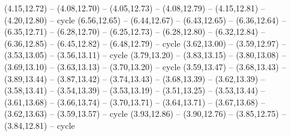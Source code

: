 {  (4.15,12.72) -- (4.08,12.70) -- (4.05,12.73) -- (4.08,12.79) -- (4.15,12.81) -- (4.20,12.80) -- cycle
  (6.56,12.65) -- (6.44,12.67) -- (6.43,12.65) -- (6.36,12.64) -- (6.35,12.71) -- (6.28,12.70) -- (6.25,12.73) -- (6.28,12.80) -- (6.32,12.84) -- (6.36,12.85) -- (6.45,12.82) -- (6.48,12.79) -- cycle
  (3.62,13.00) -- (3.59,12.97) -- (3.53,13.05) -- (3.56,13.11) -- cycle
  (3.79,13.20) -- (3.83,13.15) -- (3.80,13.08) -- (3.69,13.10) -- (3.63,13.13) -- (3.70,13.20) -- cycle
  (3.59,13.47) -- (3.68,13.43) -- (3.89,13.44) -- (3.87,13.42) -- (3.74,13.43) -- (3.68,13.39) -- (3.62,13.39) -- (3.58,13.41) -- (3.54,13.39) -- (3.53,13.19) -- (3.51,13.25) -- (3.53,13.44) -- (3.61,13.68) -- (3.66,13.74) -- (3.70,13.71) -- (3.64,13.71) -- (3.67,13.68) -- (3.62,13.63) -- (3.59,13.57) -- cycle
  (3.93,12.86) -- (3.90,12.76) -- (3.85,12.75) -- (3.84,12.81) -- cycle}
